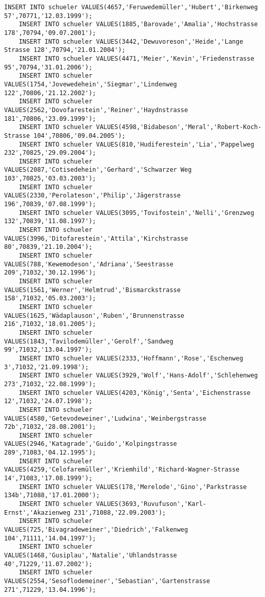\begin{lstlisting}[breaklines=True, numbers=none, basicstyle=\tiny, keepspaces=false]
	INSERT INTO schueler VALUES(4657,'Feruwedemüller','Hubert','Birkenweg 57',70771,'12.03.1999');
	INSERT INTO schueler VALUES(1885,'Barovade','Amalia','Hochstrasse 178',70794,'09.07.2001');
	INSERT INTO schueler VALUES(3442,'Dewuvoreson','Heide','Lange Strasse 128',70794,'21.01.2004');
	INSERT INTO schueler VALUES(4471,'Meier','Kevin','Friedenstrasse 95',70794,'31.01.2006');
	INSERT INTO schueler VALUES(1754,'Jovewedehein','Siegmar','Lindenweg 122',70806,'21.12.2002');
	INSERT INTO schueler VALUES(2562,'Dovofarestein','Reiner','Haydnstrasse 181',70806,'23.09.1999');
	INSERT INTO schueler VALUES(4598,'Bidabeson','Meral','Robert-Koch-Strasse 104',70806,'09.04.2005');
	INSERT INTO schueler VALUES(810,'Hudiferestein','Lia','Pappelweg 232',70825,'29.09.2004');
	INSERT INTO schueler VALUES(2087,'Cotisedehein','Gerhard','Schwarzer Weg 103',70825,'03.03.2003');
	INSERT INTO schueler VALUES(2330,'Perolateson','Philip','Jägerstrasse 196',70839,'07.08.1999');
	INSERT INTO schueler VALUES(3095,'Tovifostein','Nelli','Grenzweg 132',70839,'11.08.1997');
	INSERT INTO schueler VALUES(3996,'Ditofarestein','Attila','Kirchstrasse 80',70839,'21.10.2004');
	INSERT INTO schueler VALUES(788,'Kewemodeson','Adriana','Seestrasse 209',71032,'30.12.1996');
	INSERT INTO schueler VALUES(1561,'Werner','Helmtrud','Bismarckstrasse 158',71032,'05.03.2003');
	INSERT INTO schueler VALUES(1625,'Wädaplauson','Ruben','Brunnenstrasse 216',71032,'18.01.2005');
	INSERT INTO schueler VALUES(1843,'Tavilodemüller','Gerolf','Sandweg 99',71032,'13.04.1997');
	INSERT INTO schueler VALUES(2333,'Hoffmann','Rose','Eschenweg 3',71032,'21.09.1998');
	INSERT INTO schueler VALUES(3929,'Wolf','Hans-Adolf','Schlehenweg 273',71032,'22.08.1999');
	INSERT INTO schueler VALUES(4203,'König','Senta','Eichenstrasse 12',71032,'24.07.1998');
	INSERT INTO schueler VALUES(4580,'Getevodeweiner','Ludwina','Weinbergstrasse 72b',71032,'28.08.2001');
	INSERT INTO schueler VALUES(2946,'Katagrade','Guido','Kolpingstrasse 289',71083,'04.12.1995');
	INSERT INTO schueler VALUES(4259,'Celofaremüller','Kriemhild','Richard-Wagner-Strasse 14',71083,'17.08.1999');
	INSERT INTO schueler VALUES(178,'Merelode','Gino','Parkstrasse 134b',71088,'17.01.2000');
	INSERT INTO schueler VALUES(3693,'Ruvufuson','Karl-Ernst','Akazienweg 231',71088,'22.09.2003');
	INSERT INTO schueler VALUES(725,'Bivagradeweiner','Diedrich','Falkenweg 104',71111,'14.04.1997');
	INSERT INTO schueler VALUES(1468,'Gusiplau','Natalie','Uhlandstrasse 40',71229,'11.07.2002');
	INSERT INTO schueler VALUES(2554,'Sesoflodemeiner','Sebastian','Gartenstrasse 271',71229,'13.04.1996');

\end{lstlisting}
